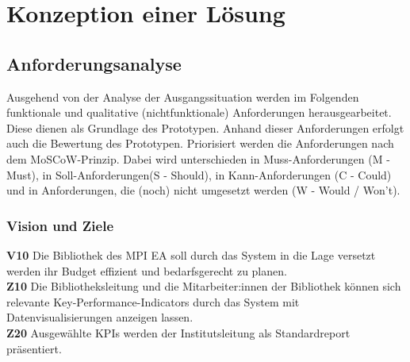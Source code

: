 \chapter{Konzeption einer Lösung}
\label{chap:four}

\section{Anforderungsanalyse}
Ausgehend von der Analyse der Ausgangssituation werden im Folgenden funktionale und qualitative (nichtfunktionale)
Anforderungen herausgearbeitet. Diese dienen als Grundlage des Prototypen. Anhand dieser Anforderungen erfolgt 
auch die Bewertung des Prototypen. Priorisiert werden die Anforderungen nach dem MoSCoW-Prinzip. 
Dabei wird unterschieden in Muss-Anforderungen (M - Must), in Soll-Anforderungen(S - Should), in Kann-Anforderungen (C - Could) und in Anforderungen,
die (noch) nicht umgesetzt werden (W - Would / Won't).

\subsection{Vision und Ziele}
\textbf{V10} Die Bibliothek des \acrshort{MPI EA} soll durch das System in die Lage versetzt werden ihr Budget effizient und bedarfsgerecht zu planen.\\
\textbf{Z10} Die Bibliotheksleitung und die Mitarbeiter:innen der Bibliothek können sich relevante Key-Performance-Indicators durch das System mit
Datenvisualisierungen anzeigen lassen. \\
\textbf{Z20} Ausgewählte KPIs werden der Institutsleitung als Standardreport präsentiert.

